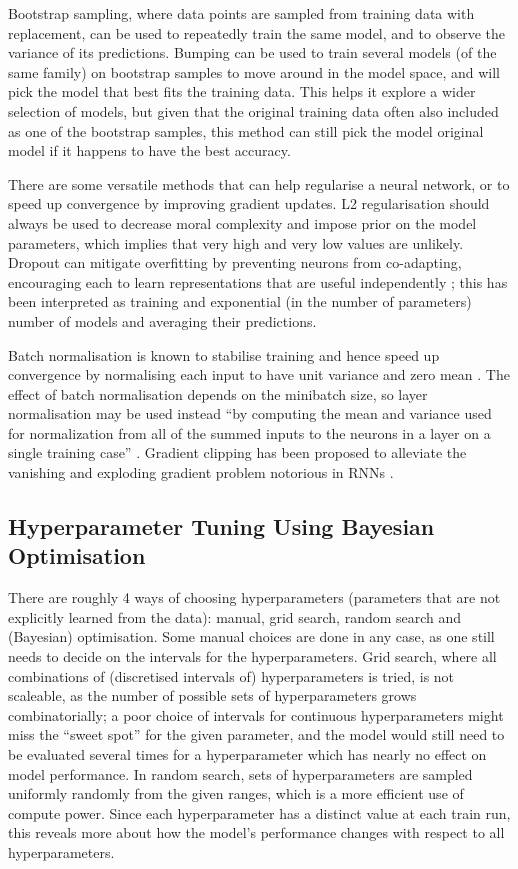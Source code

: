 Bootstrap sampling, where data points are sampled from training data with replacement, can be used to repeatedly train the same model, and to observe the variance of its predictions.
Bumping can be used to train several models (of the same family) on bootstrap samples to move around in the model space, and will pick the model that best fits the training data.
This helps it explore a wider selection of models, but given that the original training data often also included as one of the bootstrap samples, this method  can still pick the model original model if it happens to have the best accuracy.

There are some versatile methods that can help regularise a neural network, or to speed up convergence by improving  gradient updates.
L2  regularisation should always be used to decrease moral complexity and impose prior on the model parameters, which  implies that very high and very low values are unlikely.
Dropout can mitigate overfitting by preventing neurons from co-adapting, encouraging each to learn representations that are useful independently \cite{dropout}; this has been interpreted as training and exponential (in the number of parameters) number of models and averaging their predictions.

Batch normalisation is known to stabilise training and hence speed up convergence  by normalising each input to have unit variance and zero mean \cite{batch_norm}.
The effect of batch normalisation depends on the minibatch size, so layer normalisation may be used instead ``by computing the mean and variance used for normalization from all of the summed inputs to the neurons in a layer on a single training case'' \cite{layer_norm}.
Gradient clipping has been proposed to alleviate the vanishing and exploding gradient problem notorious in RNNs \cite{grad_clip}.

\subsection{Hyperparameter Tuning Using Bayesian Optimisation}
\label{bayesian_opt}

There are roughly 4 ways of choosing hyperparameters (parameters that are not explicitly learned from the data): manual, grid search, random search and (Bayesian) optimisation.
Some manual choices are done in any case, as one still needs to decide on the intervals for the hyperparameters.
Grid search, where all combinations of (discretised intervals of) hyperparameters is tried, is not scaleable, as the number of possible sets of hyperparameters grows combinatorially; a poor choice of intervals for continuous hyperparameters might miss the ``sweet spot'' for the given parameter, and the model would still need to be evaluated several times for a hyperparameter which has nearly no effect on model performance.
In random search, sets of hyperparameters are sampled uniformly randomly from the given ranges, which is a more efficient use of compute power.
Since each hyperparameter has a distinct value at each train run, this reveals more about how the model's performance changes with respect to all hyperparameters.

